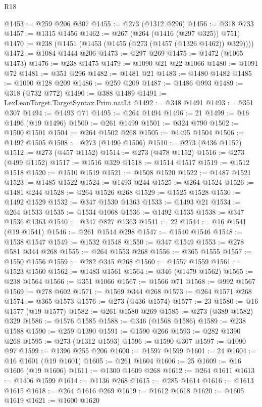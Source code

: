 \begin{lexlean}{R18}
\begin{coremodule}
{{{{{{{{{{{{{{{{{{{@1453 := @259 @206 @307
@1455 := @273 (@1312 @296)
@1456 := @318 @733
@1457 := @1315 @1456
@1462 := @267 (@264 (@1416 (@297 @325)) @751)
@1470 := @238 (@1451 (@1453 (@1455 (@273 (@1457 (@1326 @1462)) @329))))
@1472 := @1084 @1444 @206
@1473 := @297 @269
@1475 := @1472 (@1065 @1473)
@1476 := @238 @1475
@1479 := @1090 @21 @22 @1066
@1480 := @1091 @72
@1481 := @351 @296
@1482 := @1481 @21
@1483 := @1480 @1482
@1485 := @1090 @128 @209
@1486 := @259 @209
@1487 := @1486 @993
@1489 := @318 (@732 @772)
@1490 := @388 @1489
@1491 := LexLeanTarget.TargetSyntax.Prim.natLt
@1492 := @348 @1491
@1493 := @351 @307
@1494 := @1493 @71
@1495 := @264 @1494
@1496 := 21
@1499 := @16 @1496 (@19 @1496)
@1500 := @261 @1499
@1501 := @324 @790
@1502 := @1500 @1501
@1504 := @264 @1502 @268
@1505 := @1495 @1504
@1506 := @1492 @1505
@1508 := @273 (@1490 @1506)
@1510 := @273 (@436 @1152)
@1512 := @273 (@457 @1152)
@1514 := @273 (@478 @1152)
@1516 := @273 (@499 @1152)
@1517 := @1516 @329
@1518 := @1514 @1517
@1519 := @1512 @1518
@1520 := @1510 @1519
@1521 := @1508 @1520
@1522 := @1487 @1521
@1523 := @1485 @1522
@1524 := @1493 @244
@1525 := @264 @1524
@1526 := @1481 @244
@1528 := @264 @1526 @268
@1529 := @1525 @1528
@1530 := @1492 @1529
@1532 := @347 @1530 @1363
@1533 := @1493 @21
@1534 := @264 @1533
@1535 := @1534 @1068
@1536 := @1492 @1535
@1538 := @347 @1536 @1363
@1540 := @347 @827 @1363
@1541 := 22
@1544 := @16 @1541 (@19 @1541)
@1546 := @261 @1544 @298
@1547 := @1540 @1546
@1548 := @1538 @1547
@1549 := @1532 @1548
@1550 := @347 @1549
@1553 := @278 @581 @344 @268
@1555 := @264 @1553 @268
@1556 := @365 @1555
@1557 := @1550 @1556
@1559 := @282 @345 @268
@1560 := @1557 @1559
@1561 := @1523 @1560
@1562 := @1483 @1561
@1564 := @346 (@1479 @1562)
@1565 := @238 @1564
@1566 := @351 @1066
@1567 := @1566 @71
@1568 := @992 @1567
@1569 := @278 @602
@1571 := @1569 @344 @268
@1573 := @264 @1571 @268
@1574 := @365 @1573
@1576 := @273 (@436 @1574)
@1577 := 23
@1580 := @16 @1577 (@19 @1577)
@1582 := @261 @1580 @269
@1585 := @273 (@389 @1582) @329
@1586 := @1576 @1585
@1588 := @346 (@1568 @1586)
@1589 := @238 @1588
@1590 := @259 @1390
@1591 := @1590 @266
@1593 := @282 @1390 @268
@1595 := @273 (@1312 @1593)
@1596 := @1590 @307
@1597 := @1090 @97
@1599 := @1396 @255 @206
@1600 := @1597 @1599
@1601 := 24
@1604 := @16 @1601 (@19 @1601)
@1605 := @261 @1604
@1606 := 25
@1609 := @16 @1606 (@19 @1606)
@1611 := @1300 @1609 @268
@1612 := @264 @1611
@1613 := @1406 @1599
@1614 := @1136 @268
@1615 := @285 @1614
@1616 := @1613 @1615
@1618 := @264 @1616 @269
@1619 := @1612 @1618
@1620 := @1605 @1619
@1621 := @1600 @1620
}}}}}}}}}}}}}}}}}}}
\end{coremodule}
\end{lexlean}
